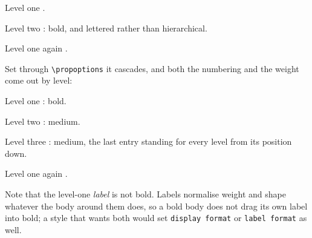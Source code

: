 \documentclass{article}
\begin{document}
\begin{prop}[style=hierarchical, body begin=\proplevelchoice{\bfseries,\mdseries}]
  \item Level one \wt.
  \begin{prop}
    \item Level two \wt: bold, and lettered rather than hierarchical.
  \end{prop}
  \item Level one again \wt.
\end{prop}

Set through \verb|\propoptions| it cascades, and both the numbering and the
weight come out by level:

{
\begin{prop}
  \item Level one \wt: bold.
  \begin{prop}
    \item Level two \wt: medium.
    \begin{prop}
      \item Level three \wt: medium, the last entry standing for every level
        from its position down.
    \end{prop}
  \end{prop}
  \item Level one again \wt.
\end{prop}}

Note that the level-one \emph{label} is not bold.  Labels normalise weight and
shape whatever the body around them does, so a bold body does not drag its own
label into bold; a style that wants both would set \texttt{display format} or
\texttt{label format} as well.
\end{document}
